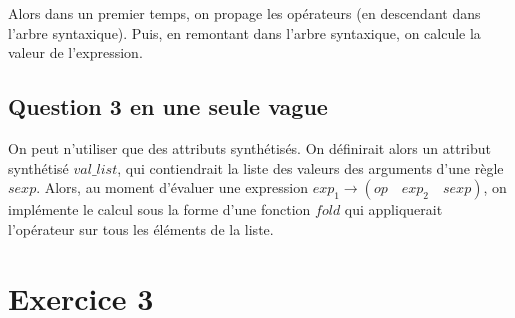 \documentclass[a4paper, 11pt]{article}
\begin{document}
Alors dans un premier temps, on propage les opérateurs (en descendant dans 
l'arbre syntaxique). Puis, en remontant dans l'arbre syntaxique, on calcule la 
valeur de l'expression.

\subsection{Question 3 en une seule vague}
On peut n'utiliser que des attributs synthétisés. On définirait alors un
attribut synthétisé $\mathit{val\_list}$, qui contiendrait la liste des valeurs
des arguments d'une règle $\mathit{sexp}$. Alors, au moment d'évaluer une
expression $\mathit{exp}_1 \rightarrow (op\quad \mathit{exp}_2\quad
\mathit{sexp}) $, on implémente le calcul sous la forme d'une fonction
$\mathit{fold}$ qui appliquerait l'opérateur sur tous les éléments de la liste.


\section{Exercice 3}
    
\end{document}
